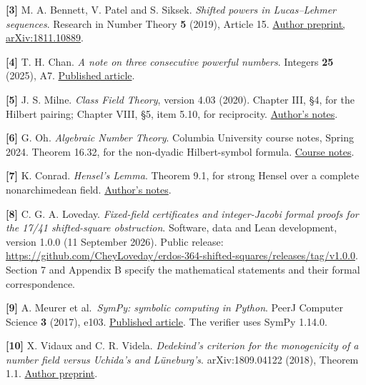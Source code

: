 \documentclass[11pt,a4paper]{article}
\begin{document}
\protect{}\label{reference-3}
\textbf{{[}3{]}} M. A. Bennett, V. Patel and S. Siksek. \emph{Shifted
powers in Lucas--Lehmer sequences}. Research in Number Theory \textbf{5}
(2019), Article 15. \href{https://arxiv.org/abs/1811.10889}{Author
preprint, arXiv:1811.10889}.

\protect{}\label{reference-4}
\textbf{{[}4{]}} T. H. Chan. \emph{A note on three consecutive powerful
numbers}. Integers \textbf{25} (2025), A7.
\href{https://math.colgate.edu/~integers/z7/z7.pdf}{Published article}.

\protect{}\label{reference-5}
\textbf{{[}5{]}} J. S. Milne. \emph{Class Field Theory}, version 4.03
(2020). Chapter III, §4, for the Hilbert pairing; Chapter VIII, §5, item
5.10, for reciprocity.
\href{https://www.jmilne.org/math/CourseNotes/CFT.pdf}{Author's notes}.

\protect{}\label{reference-6}
\textbf{{[}6{]}} G. Oh. \emph{Algebraic Number Theory}. Columbia
University course notes, Spring 2024. Theorem 16.32, for the non-dyadic
Hilbert-symbol formula.
\href{https://www.math.columbia.edu/~gyujinoh/Spring2024/ANT.pdf}{Course
notes}.

\protect{}\label{reference-7}
\textbf{{[}7{]}} K. Conrad. \emph{Hensel's Lemma}. Theorem 9.1, for
strong Hensel over a complete nonarchimedean field.
\href{https://kconrad.math.uconn.edu/blurbs/gradnumthy/hensel.pdf}{Author's
notes}.

\protect{}\label{reference-8}
\textbf{{[}8{]}} C. G. A. Loveday. \emph{Fixed-field certificates and
integer-Jacobi formal proofs for the 17/41 shifted-square obstruction}.
Software, data and Lean development, version 1.0.0 (11 September 2026).
Public release:
\url{https://github.com/CheyLoveday/erdos-364-shifted-squares/releases/tag/v1.0.0}.
Section 7 and Appendix B specify the mathematical statements and their
formal correspondence.

\protect{}\label{reference-9}
\textbf{{[}9{]}} A. Meurer et al.~\emph{SymPy: symbolic computing in
Python}. PeerJ Computer Science \textbf{3} (2017), e103.
\href{https://doi.org/10.7717/peerj-cs.103}{Published article}. The
verifier uses SymPy 1.14.0.

\protect{}\label{reference-10}
\textbf{{[}10{]}} X. Vidaux and C. R. Videla. \emph{Dedekind's criterion
for the monogenicity of a number field versus Uchida's and Lüneburg's}.
arXiv:1809.04122 (2018), Theorem 1.1.
\href{https://arxiv.org/abs/1809.04122}{Author preprint}.
\end{document}
